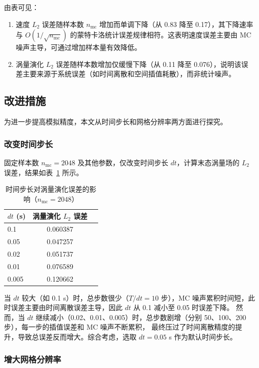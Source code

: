 \documentclass[UTF8,fontset=fandol]{ctexart}
\begin{document}
由表可见：
\begin{enumerate}
    \item 速度 $L_2$ 误差随样本数 $n_{\mathrm{mc}}$ 增加而单调下降（从 0.83 降至 0.17），其下降速率与 $O(1/\sqrt{n_{\mathrm{mc}}})$ 的蒙特卡洛统计误差规律相符。这表明速度误差主要由 MC 噪声主导，可通过增加样本量有效降低。
    \item 涡量演化 $L_2$ 误差随样本数增加仅缓慢下降（从 0.11 降至 0.076），说明该误差主要来源于系统误差（如时间离散和空间插值耗散），而非统计噪声。
\end{enumerate}

\subsection{改进措施}

为进一步提高模拟精度，本文从时间步长和网格分辨率两方面进行探究。

\subsubsection{改变时间步长}

固定样本数 $n_{\mathrm{mc}}=2048$ 及其他参数，仅改变时间步长 $dt$，计算末态涡量场的 $L_2$ 误差，结果如表~\ref{tab:time} 所示。

\begin{table}[htbp]
\centering
\caption{时间步长对涡量演化误差的影响（$n_{\mathrm{mc}}=2048$）}
\label{tab:time}
\begin{tabular}{lcc}
\toprule
$dt$ (s) & 涡量演化 $L_2$ 误差 \\
\midrule
0.1   & 0.060387 \\
0.05  & 0.047257 \\
0.02  & 0.051737 \\
0.01  & 0.076589 \\
0.005 & 0.120662 \\
\bottomrule
\end{tabular}
\end{table}

当 $dt$ 较大（如 0.1 s）时，总步数很少（$T/dt = 10$ 步），MC 噪声累积时间短，此时误差主要由时间离散误差主导，因此 $dt$ 从 0.1 减小至 0.05 时误差下降。
然而，当 $dt$ 继续减小（0.02、0.01、0.005）时，总步数剧增（分别 50、100、200 步），每一步的插值误差和 MC 噪声不断累积，
最终压过了时间离散精度的提升，导致总误差反而增大。综合考虑，选取 $dt = 0.05$ s 作为默认时间步长。

\subsubsection{增大网格分辨率}
\end{document}
